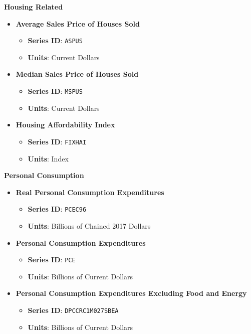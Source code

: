 \documentclass{article}
\begin{document}
\textbf{Housing Related}
\begin{itemize} 
  \item \textbf{Average Sales Price of Houses Sold}
  \begin{itemize}
      \item \textbf{Series ID}: \texttt{ASPUS}
      \item \textbf{Units}: Current Dollars
  \end{itemize}

  \item \textbf{Median Sales Price of Houses Sold}
  \begin{itemize}
      \item \textbf{Series ID}: \texttt{MSPUS}
      \item \textbf{Units}: Current Dollars
  \end{itemize}
  
  \item \textbf{Housing Affordability Index}
  \begin{itemize}
      \item \textbf{Series ID}: \texttt{FIXHAI}
      \item \textbf{Units}: Index
  \end{itemize}
\end{itemize}

\textbf{Personal Consumption}
\begin{itemize}
  \item \textbf{Real Personal Consumption Expenditures}
  \begin{itemize}
      \item \textbf{Series ID}: \texttt{PCEC96}
      \item \textbf{Units}: Billions of Chained 2017 Dollars
  \end{itemize}

  \item \textbf{Personal Consumption Expenditures}
  \begin{itemize}
      \item \textbf{Series ID}: \texttt{PCE}
      \item \textbf{Units}: Billions of Current Dollars
  \end{itemize}

  \item \textbf{Personal Consumption Expenditures Excluding Food and Energy}
  \begin{itemize}
      \item \textbf{Series ID}: \texttt{DPCCRC1M027SBEA}
      \item \textbf{Units}: Billions of Current Dollars
  \end{itemize}
\end{itemize}
\end{document}
